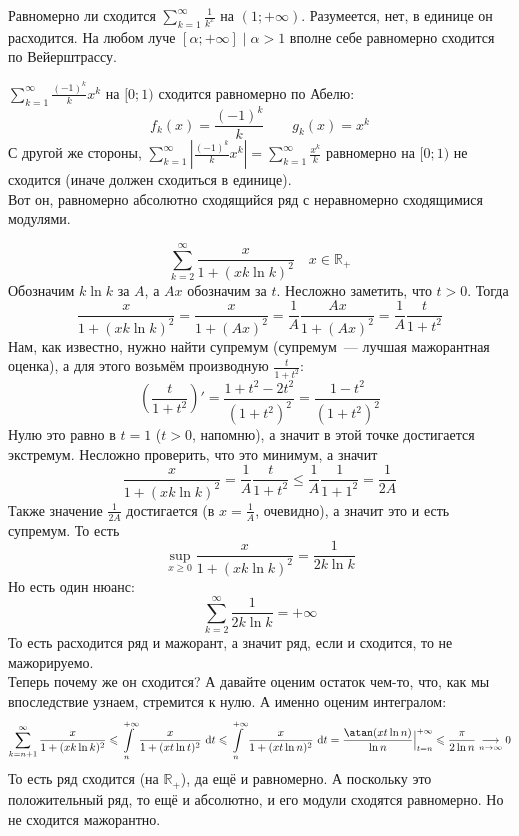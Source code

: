 \documentclass{article}
\begin{document}
    \begin{example}
        Равномерно ли сходится $\sum\limits_{k=1}^\infty\frac1{k^x}$ на $(1;+\infty)$. Разумеется, нет, в единице он расходится. На любом луче $[\alpha;+\infty]\mid\alpha>1$ вполне себе равномерно сходится по Вейерштрассу.
    \end{example}
    \begin{example}
        \label{Равномерно абсолютно сходящийся ряд с неравномерно сходящимися модулями}
        $\sum\limits_{k=1}^\infty\frac{(-1)^k}kx^k$ на $[0;1)$ сходится равномерно по Абелю:
        $$
        f_k(x)=\frac{(-1)^k}k\qquad g_k(x)=x^k
        $$
        С другой же стороны, $\sum\limits_{k=1}^\infty\left|\frac{(-1)^k}kx^k\right|=\sum\limits_{k=1}^\infty\frac{x^k}k$ равномерно на $[0;1)$ не сходится (иначе должен сходиться в единице).\\
        Вот он, равномерно абсолютно сходящийся ряд с неравномерно сходящимися модулями.
    \end{example}
    \begin{example}
        \label{Положительный равномерно немажорируемо сходящийся ряд}
        $$
        \sum\limits_{k=2}^\infty\frac x{1+(xk\ln k)^2}\quad x\in\mathbb R_+
        $$
        Обозначим $k\ln k$ за $A$, а $Ax$ обозначим за $t$. Несложно заметить, что $t>0$. Тогда
        $$
        \frac x{1+(xk\ln k)^2}=\frac x{1+(Ax)^2}=\frac1A\frac{Ax}{1+(Ax)^2}=\frac1A\frac{t}{1+t^2}
        $$
        Нам, как известно, нужно найти супремум (супремум~--- лучшая мажорантная оценка), а для этого возьмём производную $\frac{t}{1+t^2}$:
        $$
        \left(\frac{t}{1+t^2}\right)'=\frac{1+t^2-2t^2}{(1+t^2)^2}=\frac{1-t^2}{(1+t^2)^2}
        $$
        Нулю это равно в $t=1$ ($t>0$, напомню), а значит в этой точке достигается экстремум. Несложно проверить, что это минимум, а значит
        $$
        \frac x{1+(xk\ln k)^2}=\frac1A\frac{t}{1+t^2}\leqslant\frac1A\frac{1}{1+1^2}=\frac1{2A}
        $$
        Также значение $\frac1{2A}$ достигается (в $x=\frac1A$, очевидно), а значит это и есть супремум. То есть
        $$
        \sup\limits_{x\geqslant0}\frac x{1+(xk\ln k)^2}=\frac1{2k\ln k}
        $$
        Но есть один нюанс:
        $$
        \sum\limits_{k=2}^\infty\frac1{2k\ln k}=+\infty
        $$
        То есть расходится ряд и мажорант, а значит ряд, если и сходится, то не мажорируемо.\\
        Теперь почему же он сходится? А давайте оценим остаток чем-то, что, как мы впоследствие узнаем, стремится к нулю. А именно оценим интегралом:
        $$
        \sum\limits_{k=n+1}^\infty\frac x{1+(xk\ln k)^2}\leqslant\int\limits_n^{+\infty}\frac x{1+(xt\ln t)^2}~\mathrm dt\leqslant\int\limits_n^{+\infty}\frac x{1+(xt\ln n)^2}~\mathrm dt=\frac{\atan(xt\ln n)}{\ln n}\Big|_{t=n}^{+\infty}\leqslant\frac\pi{2\ln n}\underset{n\to\infty}\longrightarrow0
        $$
        То есть ряд сходится (на $\mathbb R_+$), да ещё и равномерно. А поскольку это положительный ряд, то ещё и абсолютно, и его модули сходятся равномерно. Но не сходится мажорантно.
    \end{example}
\end{document}
